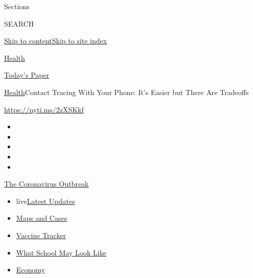 Sections

SEARCH

\protect\hyperlink{site-content}{Skip to
content}\protect\hyperlink{site-index}{Skip to site index}

\href{https://www.nytimes3xbfgragh.onion/section/health}{Health}

\href{https://myaccount.nytimes3xbfgragh.onion/auth/login?response_type=cookie\&client_id=vi}{}

\href{https://www.nytimes3xbfgragh.onion/section/todayspaper}{Today's
Paper}

\href{/section/health}{Health}\textbar{}Contact Tracing With Your Phone:
It's Easier but There Are Tradeoffs

\url{https://nyti.ms/2zXSKkf}

\begin{itemize}
\item
\item
\item
\item
\item
\end{itemize}

\href{https://www.nytimes3xbfgragh.onion/news-event/coronavirus?action=click\&pgtype=Article\&state=default\&region=TOP_BANNER\&context=storylines_menu}{The
Coronavirus Outbreak}

\begin{itemize}
\tightlist
\item
  live\href{https://www.nytimes3xbfgragh.onion/2020/08/01/world/coronavirus-covid-19.html?action=click\&pgtype=Article\&state=default\&region=TOP_BANNER\&context=storylines_menu}{Latest
  Updates}
\item
  \href{https://www.nytimes3xbfgragh.onion/interactive/2020/us/coronavirus-us-cases.html?action=click\&pgtype=Article\&state=default\&region=TOP_BANNER\&context=storylines_menu}{Maps
  and Cases}
\item
  \href{https://www.nytimes3xbfgragh.onion/interactive/2020/science/coronavirus-vaccine-tracker.html?action=click\&pgtype=Article\&state=default\&region=TOP_BANNER\&context=storylines_menu}{Vaccine
  Tracker}
\item
  \href{https://www.nytimes3xbfgragh.onion/interactive/2020/07/29/us/schools-reopening-coronavirus.html?action=click\&pgtype=Article\&state=default\&region=TOP_BANNER\&context=storylines_menu}{What
  School May Look Like}
\item
  \href{https://www.nytimes3xbfgragh.onion/live/2020/07/31/business/stock-market-today-coronavirus?action=click\&pgtype=Article\&state=default\&region=TOP_BANNER\&context=storylines_menu}{Economy}
\end{itemize}

